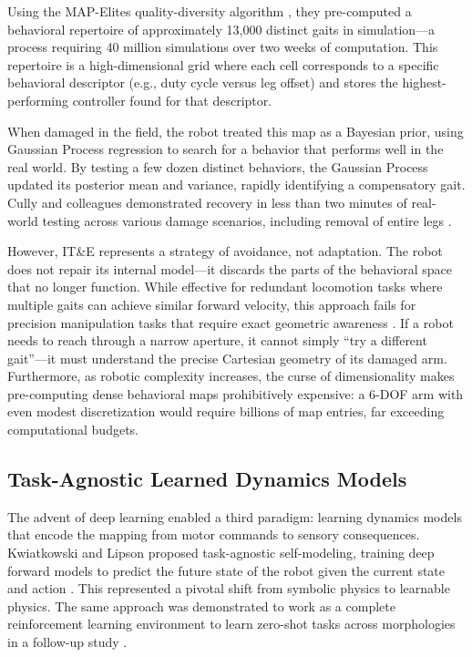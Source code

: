 \documentclass[12pt,a4paper,oneside]{report}
\begin{document}
Using the MAP-Elites quality-diversity algorithm \cite{mouret2015illuminating}, they pre-computed a behavioral repertoire of approximately 13,000 distinct gaits in simulation---a process requiring 40 million simulations over two weeks of computation. This repertoire is a high-dimensional grid where each cell corresponds to a specific behavioral descriptor (e.g., duty cycle versus leg offset) and stores the highest-performing controller found for that descriptor.

When damaged in the field, the robot treated this map as a Bayesian prior, using Gaussian Process regression to search for a behavior that performs well in the real world. By testing a few dozen distinct behaviors, the Gaussian Process updated its posterior mean and variance, rapidly identifying a compensatory gait. Cully and colleagues demonstrated recovery in less than two minutes of real-world testing across various damage scenarios, including removal of entire legs \cite{cully2015robots}.

However, IT\&E represents a strategy of avoidance, not adaptation. The robot does not repair its internal model---it discards the parts of the behavioral space that no longer function. While effective for redundant locomotion tasks where multiple gaits can achieve similar forward velocity, this approach fails for precision manipulation tasks that require exact geometric awareness \cite{kwiatkowski2019task}. If a robot needs to reach through a narrow aperture, it cannot simply ``try a different gait''---it must understand the precise Cartesian geometry of its damaged arm. Furthermore, as robotic complexity increases, the curse of dimensionality makes pre-computing dense behavioral maps prohibitively expensive: a 6-DOF arm with even modest discretization would require billions of map entries, far exceeding computational budgets.
\subsection{Task-Agnostic Learned Dynamics Models}
\label{subsec:task_agnostic_models}

The advent of deep learning enabled a third paradigm: learning dynamics models that encode the mapping from motor commands to sensory consequences. Kwiatkowski and Lipson proposed task-agnostic self-modeling, training deep forward models to predict the future state of the robot given the current state and action \cite{kwiatkowski2019task}. This represented a pivotal shift from symbolic physics to learnable physics. The same approach was demonstrated to work as a complete reinforcement learning environment to learn zero-shot tasks across morphologies in a follow-up study \cite{kwiatkowski2019zeroshot}.
\end{document}
